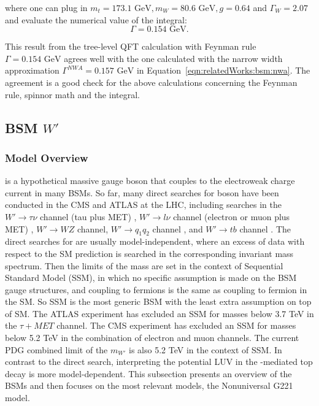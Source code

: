 \noindent where one can plug in $m_t= 173.1 \text{ GeV}, m_W= 80.6 \text{ GeV}, g=0.64 $  and $\Gamma_W = 2.07$ and evaluate the numerical value of the integral:
\begin{equation}
         \Gamma = 0.154 \text{ GeV} .
\end{equation} 


\noindent This result from the tree-level QFT calculation with Feynman rule  $\Gamma = 0.154 \text{ GeV} $ agrees well with the one calculated with the narrow width approximation $\Gamma^{NWA} = 0.157 \text{ GeV} $ in Equation~\ref{eqn:relatedWorks:bsm:nwa}. The agreement is a good check for the above calculations concerning the Feynman rule, spinnor math and the integral.





 
\subsection{BSM $W'$}
\label{sec:relatedWorks:bsm:WPrime}

\subsubsection{Model Overview}
\PWpr is a hypothetical massive gauge boson that couples to the electroweak charge current in many BSMs. So far, many direct searches for \PWpr boson have been conducted in the CMS and ATLAS at the LHC, including searches in the $W'\to \tau \nu$  channel (tau plus MET) \cite{Sirunyan:2018lbg, Khachatryan:2015pua,Aaboud:2018vgh}, $W'\to l \nu$ channel (electron or muon plus MET) \cite{Sirunyan:2018mpc, Aaboud:2017efa}, $W'\to W Z$ channel\cite{Sirunyan:2018ivv, Aaboud:2017eta}, $W'\to q_1 q_2$ channel \cite{Sirunyan:2016iap, Aaboud:2017yvp}, and $W'\to t b$ channel \cite{Sirunyan:2017vkm, Aaboud:2018juj}. The direct searches for \PWpr are usually model-independent, where an excess of data with respect to the SM prediction is searched in the corresponding invariant mass spectrum. Then the limits of the \PWpr mass are set in the context of Sequential Standard Model (SSM), in which no specific assumption is made on the BSM gauge structures, and \PWpr coupling to fermions is the same as \PW coupling to fermion in the SM. So SSM is the most generic \PWpr BSM with the least extra assumption on top of SM. The ATLAS experiment has excluded an SSM \PWpr for masses below 3.7 TeV in the $\tau+MET$ channel. The CMS experiment has excluded an SSM \PWpr for masses below 5.2 TeV in the combination of electron and muon channels. The current PDG combined limit of the $m_{W'}$ is also 5.2 TeV in the context of SSM. In contrast to the direct search, interpreting the potential LUV in the \PWpr-mediated top decay is more model-dependent. This subsection presents an overview of the \PWpr BSMs and then focuses on the most relevant \PWpr models, the Nonuniversal G221 model.




